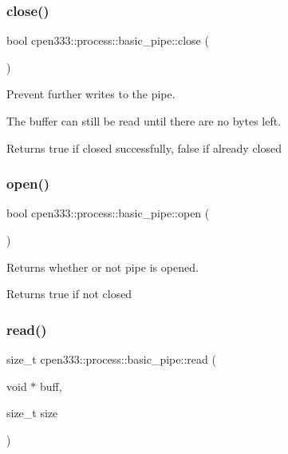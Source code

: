 \subsubsection{\texorpdfstring{close()}{close()}}
{\footnotesize\ttfamily bool cpen333\+::process\+::basic\+\_\+pipe\+::close (\begin{DoxyParamCaption}{ }\end{DoxyParamCaption})\hspace{0.3cm}{\ttfamily [inline]}}



Prevent further writes to the pipe. 

The buffer can still be read until there are no bytes left.

\begin{DoxyReturn}{Returns}
true if closed successfully, false if already closed 
\end{DoxyReturn}
\mbox{\label{classcpen333_1_1process_1_1basic__pipe_a3931c0bae22d8f27fae99d7accbade88}} 
\subsubsection{\texorpdfstring{open()}{open()}}
{\footnotesize\ttfamily bool cpen333\+::process\+::basic\+\_\+pipe\+::open (\begin{DoxyParamCaption}{ }\end{DoxyParamCaption})\hspace{0.3cm}{\ttfamily [inline]}}



Returns whether or not pipe is opened. 

\begin{DoxyReturn}{Returns}
true if not closed 
\end{DoxyReturn}
\mbox{\label{classcpen333_1_1process_1_1basic__pipe_a85cc99d4363243a02c7c0ee091f67270}} 
\subsubsection{\texorpdfstring{read()}{read()}\hspace{0.1cm}{\footnotesize\ttfamily [1/2]}}
{\footnotesize\ttfamily size\+\_\+t cpen333\+::process\+::basic\+\_\+pipe\+::read (\begin{DoxyParamCaption}\item[{void $\ast$}]{buff,  }\item[{size\+\_\+t}]{size }\end{DoxyParamCaption})\hspace{0.3cm}{\ttfamily [inline]}}



